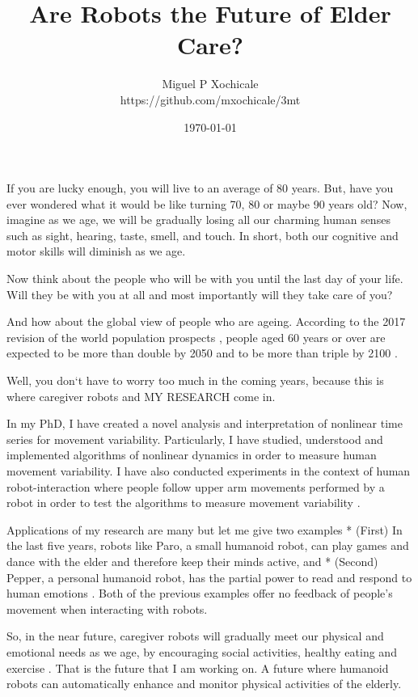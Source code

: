\documentclass[12pt]{article}
\title{ Are Robots the Future of Elder Care?  }
\author{Miguel P Xochicale \\
https://github.com/mxochicale/3mt}
\date{\today}
\begin{document}
\maketitle

If you are lucky enough, you will live to an average of 80 years.
But, have you ever wondered what it would be like turning 70, 80 or maybe 90 years old?
Now, imagine as we age, we will be gradually losing all our
charming human senses such as sight, hearing, taste, smell, and touch.
In short, both our cognitive and motor skills will diminish as we age.

Now think about the people who will be with you until the last day of your life.
Will they be with you at all 
and most importantly will they take care of you?

And how about the global view of people who are ageing.
According to the 2017 revision of the world population prospects \cite{un2017}, 
people aged 60 years or over
are expected to be more than double by 2050 and to be more than triple by 2100 \cite{unb2017}.

Well, you don`t have to worry too much in the coming years, 
because this is where caregiver robots and MY RESEARCH come in.

In my PhD, 
I have created a novel analysis and interpretation of nonlinear time series
for movement variability.
Particularly,
I have studied, understood and implemented algorithms of nonlinear dynamics
in order to measure human movement variability.
I have also conducted experiments in the context of human robot-interaction 
where people follow upper arm movements performed by a robot 
in order to test the algorithms to measure movement variability \cite{xochicale2018}.

Applications of my research are many but let me give two examples
* (First) In the last five years, 
robots like Paro, a small humanoid robot, can play games and dance with the elder
and therefore keep their minds active, and
* (Second) Pepper, a personal humanoid robot,  has the partial power 
to read and respond to human emotions \cite{hay2015}.
Both of the previous examples offer no feedback of people's movement when 
interacting with robots.

So, in the near future, caregiver robots will gradually meet our physical and emotional needs as we age, 
by encouraging social activities, healthy eating and exercise \cite{aronson2014}.
That is the future that I am working on.
A future where humanoid robots can automatically enhance and monitor physical activities of the elderly.
\end{document}
